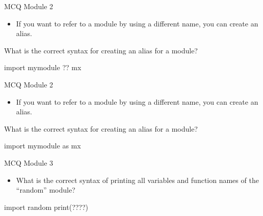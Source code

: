 \documentclass[
  8pt,
  ignorenonframetext,
]{beamer}
\newenvironment{Shaded}{\begin{snugshade}}{\end{snugshade}}
\newcommand{\BuiltInTok}[1]{#1}
\newcommand{\ImportTok}[1]{#1}
\newcommand{\NormalTok}[1]{#1}
\providecommand{\tightlist}{%
  \setlength{\itemsep}{0pt}\setlength{\parskip}{0pt}}
\begin{document}
\begin{frame}[fragile]{MCQ Module 2}
\protect\hypertarget{mcq-module-2}{}
\begin{itemize}
\tightlist
\item
  If you want to refer to a module by using a different name, you can
  create an alias.
\end{itemize}

What is the correct syntax for creating an alias for a module?

\begin{Shaded}
\begin{Highlighting}[]
\ImportTok{import}\NormalTok{ mymodule ?? mx}
\end{Highlighting}
\end{Shaded}
\end{frame}

\begin{frame}[fragile]{MCQ Module 2}
\protect\hypertarget{mcq-module-2-1}{}
\begin{itemize}
\tightlist
\item
  If you want to refer to a module by using a different name, you can
  create an alias.
\end{itemize}

What is the correct syntax for creating an alias for a module?

\begin{Shaded}
\begin{Highlighting}[]
\ImportTok{import}\NormalTok{ mymodule }\ImportTok{as}\NormalTok{ mx}
\end{Highlighting}
\end{Shaded}
\end{frame}

\begin{frame}[fragile]{MCQ Module 3}
\protect\hypertarget{mcq-module-3}{}
\begin{itemize}
\tightlist
\item
  What is the correct syntax of printing all variables and function
  names of the ``random'' module?
\end{itemize}

\begin{Shaded}
\begin{Highlighting}[]
\ImportTok{import}\NormalTok{ random}
\BuiltInTok{print}\NormalTok{(????)}
\end{Highlighting}
\end{Shaded}
\end{frame}
\end{document}
